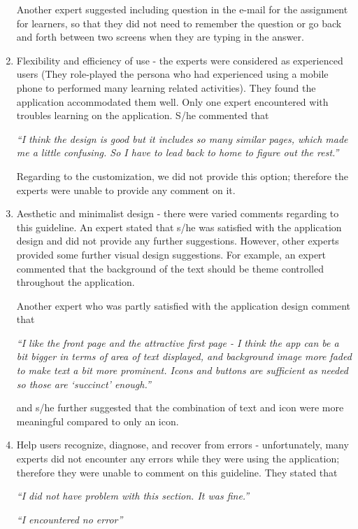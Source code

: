 \begin{enumerate}
Another expert suggested including question in the e-mail for the assignment for learners, so that they did not need to remember the question or go back and forth between two screens when they are typing in the answer.

\item Flexibility and efficiency of use - the experts were considered as experienced users (They role-played the persona who had experienced using a mobile phone to performed many learning related activities). They found the application accommodated them well. Only one expert encountered with troubles learning on the application. S/he commented that 
\begin{addmargin}[1.5em]{1.5em}
\textit{``I think the design is good but it includes so many similar pages, which made me a little confusing. So I have to lead back to home to figure out the rest.''}\end{addmargin}

Regarding to the customization, we did not provide this option; therefore the experts were unable to provide any comment on it. 

\item Aesthetic and minimalist design - there were varied comments regarding to this guideline. An expert stated that s/he was satisfied with the application design and did not provide any further suggestions. However, other experts provided some further visual design suggestions. For example, an expert commented that the background of the text should be theme controlled throughout the application. 

Another expert who was partly satisfied with the application design comment that  
\begin{addmargin}[1.5em]{1.5em}
\textit{``I like the front page and the attractive first page - I think the app can be a bit bigger in terms of area of text displayed, and background image more faded to make text a bit more prominent. Icons and buttons are sufficient as needed so those are `succinct' enough.''}\end{addmargin}

and s/he further suggested that the combination of text and icon were more meaningful compared to only an icon. 

\item Help users recognize, diagnose, and recover from errors - unfortunately, many experts did not encounter any errors while they were using the application; therefore they were unable to comment on this guideline. They stated that
\begin{addmargin}[1.5em]{1.5em}
\textit{``I did not have problem with this section. It was fine.''}\end{addmargin}
\begin{addmargin}[1.5em]{1.5em}
\textit{``I encountered no error''}\end{addmargin} 


\end{enumerate}

